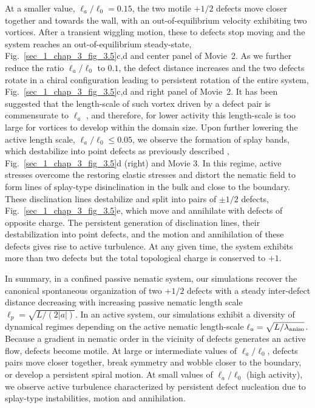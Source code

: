 \documentclass[12pt]{iopart}
\begin{document}
	
	At a smaller value, $\ell_a/\ell_0 = 0.15$, the two motile $+1/2$ defects move closer together and  towards the wall, with an out-of-equilibrium velocity exhibiting two vortices. After a transient wiggling motion, these to defects stop moving and the system reaches an out-of-equilibrium steady-state,  Fig.~\ref{sec_1_chap_3_fig_3.5}c,d and center panel of Movie~2. As we further reduce the ratio $\ell_a/\ell_0$ to $0.1$, the defect distance increases and the two defects rotate in a chiral configuration leading to persistent rotation of the entire system, Fig.~\ref{sec_1_chap_3_fig_3.5}c,d and 
	right panel of Movie~2. It has been suggested  that the length-scale of such vortex driven by a defect pair is commensurate to $\ell_a$ \cite{chandrakar2020}, and therefore, for lower activity this length-scale is too large for vortices to develop within the domain size. %
	Upon further lowering the active length scale, $\ell_a/\ell_0 \leq 0.05$, we observe the formation of splay bands, which destabilize into point defects as previously described \cite{ramaswamy2007, ramaswamy2010}, Fig.~\ref{sec_1_chap_3_fig_3.5}d (right) and Movie 3. In this regime, active stresses overcome the restoring elastic stresses and distort the nematic field to form lines of splay-type disinclination in the bulk and close to the boundary. These disclination lines destabilize and split into pairs of $\pm 1/2$ defects, Fig.~\ref{sec_1_chap_3_fig_3.5}e, which move and annihilate with defects of opposite charge. The persistent generation of disclination lines, their destabilization into point defects, and the motion and annihilation of these defects gives rise to active turbulence. At any given time, the system exhibits more than two defects but the total topological charge is conserved to $+1$.
	
	In summary, in a confined passive nematic system, our simulations recover the canonical spontaneous organization of two $+1/2$ defects with a steady inter-defect distance decreasing with increasing  passive nematic length scale $\ell_p  = \sqrt{L/\left(2|a| \right)}$. In an active system, our simulations exhibit a diversity of dynamical regimes depending on the active nematic length-scale $\ell_a= \sqrt{L/\lambda_{\rm aniso}}$. Because a gradient in nematic order in the vicinity of defects generates an active flow, defects become motile. At large or intermediate values of $\ell_a/\ell_0$, defects pairs move closer together, break symmetry and wobble closer to the boundary, or develop a persistent spiral motion. At small values of  $\ell_a/\ell_0$ (high activity), we observe active turbulence characterized by persistent defect nucleation due to splay-type instabilities, motion and annihilation. 
	
\end{document}
